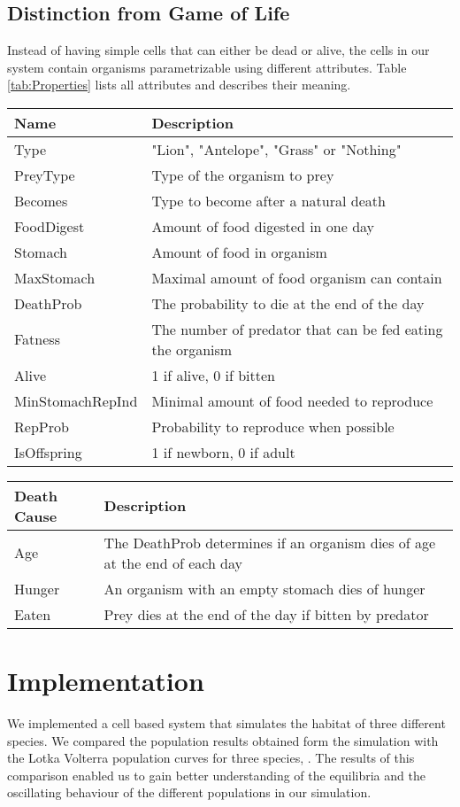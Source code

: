 \documentclass[11pt]{article}
\begin{document}
\subsection{Distinction from Game of Life}
Instead of having simple cells that can either be dead or alive, the cells in our system contain organisms parametrizable using different attributes. Table \ref{tab:Properties} lists all attributes and describes their meaning.

\begin{tabular}{l|l}\label{tab:Properties}
Name & Description\\
\hline 
\hline 
Type & "Lion", "Antelope", "Grass" or "Nothing" \\ 
\hline 
PreyType & Type of the organism to prey \\ 
\hline 
Becomes & Type to become after a natural death \\ 
\hline 
FoodDigest & Amount of food digested in one day \\ 
\hline 
Stomach & Amount of food in organism \\ 
\hline 
MaxStomach & Maximal amount of food organism can contain \\ 
\hline 
DeathProb & The probability to die at the end of the day \\ 
\hline 
Fatness & The number of predator that can be fed eating the organism \\ 
\hline
Alive & 1 if alive, 0 if bitten\\
\hline 
MinStomachRepInd & Minimal amount of food needed to reproduce \\  
\hline 
RepProb & Probability to reproduce when possible\\
\hline 
IsOffspring & 1 if newborn, 0 if adult\\
\end{tabular}

\begin{tabular}{l|l}\label{tab:deathCauses}
Death Cause & Description \\ 
\hline 
\hline 
Age & The DeathProb determines if an organism dies of age at the end of each day\\ 
\hline 
Hunger & An organism with an empty stomach dies of hunger \\ 
\hline 
Eaten & Prey dies at the end of the day if bitten by predator \\  
\end{tabular} 

\section{Implementation}
We implemented a cell based system that simulates the habitat of three different species.
We compared the population results obtained form the simulation with the Lotka Volterra population curves for three species, \cite{lotkaVolterraThreeSpecies}. The results of this comparison enabled us to gain better understanding of the equilibria and the oscillating behaviour of the different populations in our simulation.
\end{document}
